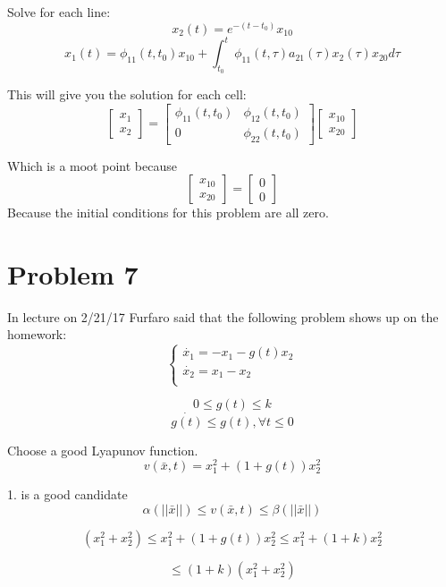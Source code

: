 \documentclass[12pt]{article}
\begin{document}
Solve for each line:
$$x_2(t)=e^{-(t-t_0)}x_{10}$$
$$x_1(t)=\phi_{11}(t,t_0)x_{10}+\int_{t_0}^{t}\phi_{11}(t,\tau)a_{21}(\tau)x_2(\tau)x_{20}d\tau$$

This will give you the solution for each cell:
$$\begin{bmatrix} x_1 \\
x_2
\end{bmatrix} = \begin{bmatrix} \phi_{11}(t,t_0) & \phi_{12}(t,t_0) \\
0 & \phi_{22}(t,t_0)
\end{bmatrix} \begin{bmatrix} x_{10} \\
x_{20}
\end{bmatrix} $$

Which is a moot point because 
$$\begin{bmatrix} x_{10} \\
x_{20}
\end{bmatrix} = \begin{bmatrix} 0 \\
0
\end{bmatrix} $$
Because the initial conditions for this problem are all zero.

\section{Problem 7}
In lecture on 2/21/17 Furfaro said that the following problem shows up on the homework:
$$\begin{cases}\dot{x_1}=-x_1-g(t)x_2\\ 
\dot{x_2}=x_1-x_2\\
\end{cases}$$ 

$$0\leq g(t)\leq k$$
$$\dot{g(t)} \leq g(t), \forall t \leq 0$$

Choose a good Lyapunov function. 
$$v(\bar{x},t)=x_1^2+(1+g(t))x_2^2$$

1. is a good candidate\\
$$\alpha(||\bar{x}||)\leq v(\bar{x},t)\leq \beta(||\bar{x}||)$$

$$(x_1^2+x_2^2)\leq x_1^2+(1+g(t))x_2^2\leq x_1^2+(1+k)x_2^2$$

$$\leq(1+k)(x_1^2+x_2^2)$$
\end{document}
